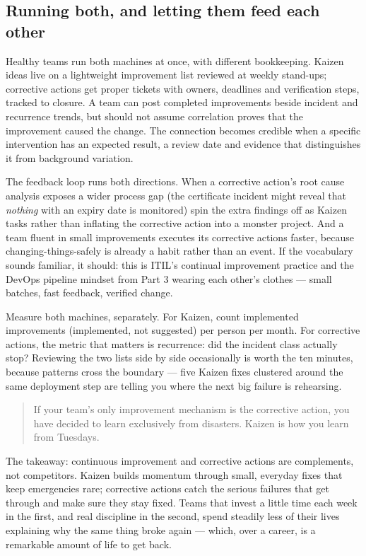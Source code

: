 \subsection{Running both, and letting them feed each other}


Healthy teams run both machines at once, with different bookkeeping. Kaizen ideas live on a lightweight improvement list reviewed at weekly stand-ups; corrective actions get proper tickets with owners, deadlines and verification steps, tracked to closure. A team can post completed improvements beside incident and recurrence trends, but should not assume correlation proves that the improvement caused the change. The connection becomes credible when a specific intervention has an expected result, a review date and evidence that distinguishes it from background variation.


The feedback loop runs both directions. When a corrective action's root cause analysis exposes a wider process gap (the certificate incident might reveal that \emph{nothing} with an expiry date is monitored) spin the extra findings off as Kaizen tasks rather than inflating the corrective action into a monster project. And a team fluent in small improvements executes its corrective actions faster, because changing-things-safely is already a habit rather than an event. If the vocabulary sounds familiar, it should: this is ITIL's continual improvement practice and the DevOps pipeline mindset from Part 3 wearing each other's clothes — small batches, fast feedback, verified change.


Measure both machines, separately. For Kaizen, count implemented improvements (implemented, not suggested) per person per month. For corrective actions, the metric that matters is recurrence: did the incident class actually stop? Reviewing the two lists side by side occasionally is worth the ten minutes, because patterns cross the boundary — five Kaizen fixes clustered around the same deployment step are telling you where the next big failure is rehearsing.



\begin{quote}\small
If your team's only improvement mechanism is the corrective action, you have decided to learn exclusively from disasters. Kaizen is how you learn from Tuesdays.
\end{quote}


The takeaway: continuous improvement and corrective actions are complements, not competitors. Kaizen builds momentum through small, everyday fixes that keep emergencies rare; corrective actions catch the serious failures that get through and make sure they stay fixed. Teams that invest a little time each week in the first, and real discipline in the second, spend steadily less of their lives explaining why the same thing broke again — which, over a career, is a remarkable amount of life to get back.

